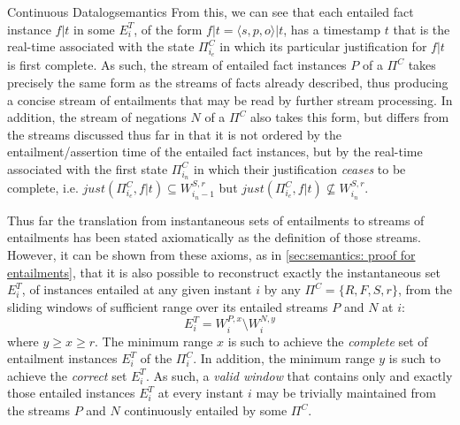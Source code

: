 \begin{nestedsection}{Continuous Datalog}{semantics}
From this, we can see that each entailed fact instance ${f|t}$ in some
$E^T_{i}$, of the form ${f|t = \langle s, p, o \rangle | t}$, has a
timestamp $t$ that is the real-time associated with the state
$\Pi^C_{i_{e}}$ in which its particular justification for ${f|t}$ is
first complete. As such, the stream of entailed fact instances $P$ of
a $\Pi^C$ takes precisely the same form as the streams of facts already
described, thus producing a concise stream of entailments that may be
read by further stream processing.  In addition, the stream of negations
$N$ of a $\Pi^C$ also takes this form, but differs from the streams
discussed thus far in that it is not ordered by the entailment/assertion
time of the entailed fact instances, but by the real-time associated
with the first state $\Pi^C_{i_{n}}$ in which their justification
\emph{ceases} to be complete, i.e. ${just(\Pi^C_{i_{e}}, f|t) \subseteq W^{S,r}_{i_n - 1}}$
but ${just(\Pi^C_{i_{e}}, f|t) \not\subseteq W^{S,r}_{i_n}}$.

Thus far the translation from instantaneous sets of entailments to
streams of entailments has been stated axiomatically as the definition
of those streams.  However, it can be shown from these axioms, as in
\ref{sec:semantics: proof for entailments}, that it is also possible
to reconstruct exactly the instantaneous set $E^T_{i}$, of instances
entailed at any given instant $i$ by any $\Pi^C = \{ R, F, S, r \}$,
from the sliding windows of sufficient range over its entailed streams
$P$ and $N$ at $i$:
\[ E^T_{i} = W^{P,x}_{i} \setminus W^{N,y}_{i} \]
where ${y \geq x \geq r}$. The minimum range $x$ is such to achieve
the \emph{complete} set of entailment instances $E^T_{i}$ of the
$\Pi^C_{i}$. In addition, the minimum range $y$ is such to achieve the
\emph{correct} set $E^T_{i}$. As such, a \emph{valid window} that
contains only and exactly those entailed instances $E^T_{i}$ at every
instant $i$ may be trivially maintained from the streams $P$ and $N$
continuously entailed by some $\Pi^C$.


\end{nestedsection}
